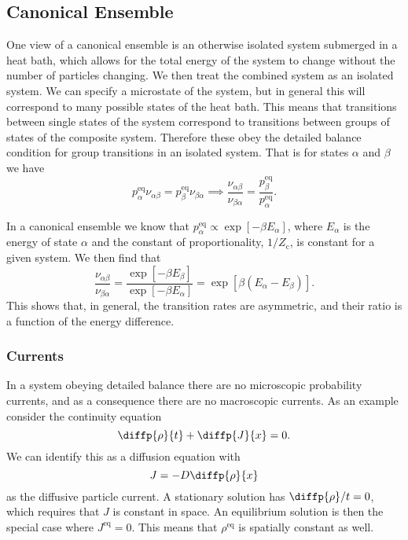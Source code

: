 \documentclass[fleqn]{NotesClass}
\newcommand*{\cpartition}{Z_{\mathrm{c}}}
\begin{document}
    \subsection{Canonical Ensemble}
    One view of a canonical ensemble is an otherwise isolated system submerged in a heat bath, which allows for the total energy of the system to change without the number of particles changing.
    We then treat the combined system as an isolated system.
    We can specify a microstate of the system, but in general this will correspond to many possible states of the heat bath.
    This means that transitions between single states of the system correspond to transitions between groups of states of the composite system.
    Therefore these obey the detailed balance condition for group transitions in an isolated system.
    That is for states \(\alpha\) and \(\beta\) we have
    \begin{equation}
        p_\alpha^{\mathrm{eq}}\nu_{\alpha\beta} = p_\beta^{\mathrm{eq}} \nu_{\beta\alpha} \implies \frac{\nu_{\alpha\beta}}{\nu_{\beta\alpha}} = \frac{p_{\beta}^{\mathrm{eq}}}{p_{\alpha}^{\mathrm{eq}}}.
    \end{equation}
    
    In a canonical ensemble we know that \(p_\alpha^{\mathrm{eq}} \propto \exp[-\beta E_\alpha]\), where \(E_\alpha\) is the energy of state \(\alpha\) and the constant of proportionality, \(1/\cpartition\), is constant for a given system.
    We then find that
    \begin{equation}
        \frac{\nu_{\alpha\beta}}{\nu_{\beta\alpha}} = \frac{\exp[-\beta E_\beta]}{\exp[-\beta E_\alpha]} = \exp[\beta(E_\alpha - E_\beta)].
    \end{equation}
    This shows that, in general, the transition rates are asymmetric, and their ratio is a function of the energy difference.
    
    \subsubsection{Currents}
    In a system obeying detailed balance there are no microscopic probability currents, and as a consequence there are no macroscopic currents.
    As an example consider the continuity equation
    \begin{equation}
        \diffp{\rho}{t} + \diffp{J}{x} = 0.
    \end{equation}
    We can identify this as a diffusion equation with
    \begin{equation}
        J = -D\diffp{\rho}{x}
    \end{equation}
    as the diffusive particle current.
    A stationary solution has \(\diffp{\rho}/{t} = 0\), which requires that \(J\) is constant in space.
    An equilibrium solution is then the special case where \(J^{\mathrm{eq}} = 0\).
    This means that \(\rho^{\mathrm{eq}}\) is spatially constant as well.
    
\end{document}
